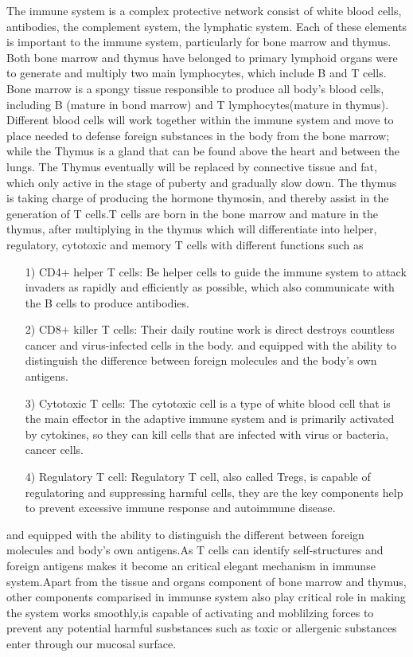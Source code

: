 \documentclass[12pt]{article}
\begin{document}
The immune system is a complex protective network consist of white blood cells, antibodies, the complement system, the lymphatic system. Each of these elements is important to the immune system, particularly for bone marrow and thymus. Both bone marrow and thymus have belonged to primary lymphoid organs were to generate and multiply two main lymphocytes, which include B and T cells.
Bone marrow is a spongy tissue responsible to produce all body's blood cells, including B (mature in bond marrow) and T lymphocytes(mature in thymus). Different blood cells will work together within the immune system and move to place needed to defense foreign substances in the body from the bone marrow; while the Thymus is a gland that can be found above the heart and between the lungs. The Thymus eventually will be replaced by connective tissue and fat, which only active in the stage of puberty and gradually slow down. The thymus is taking charge of producing the hormone thymosin, and thereby assist in the generation of T cells.T cells are born in the bone marrow and mature in the thymus, after multiplying in the thymus which will differentiate into helper, regulatory,  cytotoxic and memory T cells with different functions such as 
\begin{itemize}
    \item [1)] 
    CD4+ helper T cells: Be helper cells to guide the immune system to attack invaders as rapidly and efficiently as possible, which also communicate with the B cells to produce antibodies.
    \item [2)]
    CD8+ killer T cells: Their daily routine work is direct destroys countless cancer and virus-infected cells in the body. and equipped with the ability to distinguish the difference between foreign molecules and the body's own antigens.
    \item [3)]
    Cytotoxic T cells:
    The cytotoxic cell is a type of white blood cell that is the main effector in the adaptive immune system and is primarily activated by cytokines, so they can kill cells that are infected with virus or bacteria, cancer cells.
    \item [4)]
    Regulatory T cell:
    Regulatory T cell, also called Tregs, is capable of regulatoring and suppressing harmful cells, they are the key components help to prevent excessive immune response and autoimmune disease.
\end{itemize}
and equipped with the ability to distinguish the different between foreign molecules and body's own antigens.As T cells can identify self-structures and foreign antigens makes it become an critical elegant mechanism in immunse system.Apart from the tissue and organs component of bone marrow and thymus, other components comparised in immunse system also play critical role in making the system works smoothly,is capable of activating and moblilzing forces to prevent any  potential harmful susbstances such as toxic or allergenic substances enter through our mucosal surface.\medskip
\end{document}
